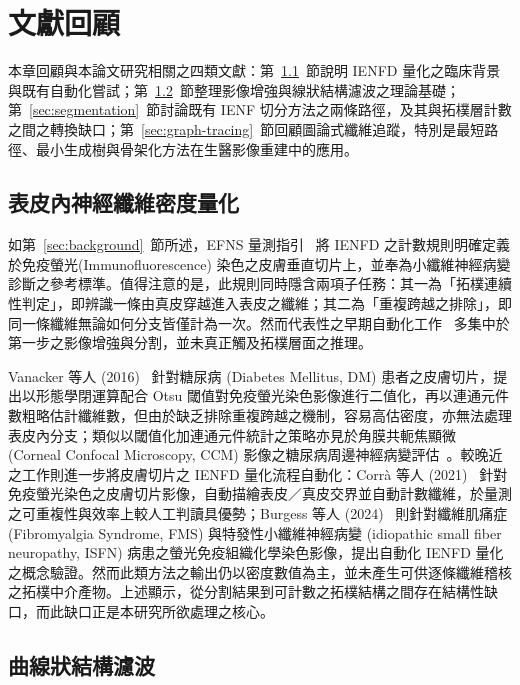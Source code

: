 
\chapter{文獻回顧}
\label{chap:related}

本章回顧與本論文研究相關之四類文獻：第~\ref{sec:ienf-related}~節說明 IENFD 量化之臨床背景與既有自動化嘗試；第~\ref{sec:vesselness}~節整理影像增強與線狀結構濾波之理論基礎；第~\ref{sec:segmentation}~節討論既有 IENF 切分方法之兩條路徑，及其與拓樸層計數之間之轉換缺口；第~\ref{sec:graph-tracing}~節回顧圖論式纖維追蹤，特別是最短路徑、最小生成樹與骨架化方法在生醫影像重建中的應用。

\section{表皮內神經纖維密度量化}
\label{sec:ienf-related}

如第~\ref{sec:background}~節所述，EFNS 量測指引~\cite{lauria2010skinbiopsy} 將 IENFD 之計數規則明確定義於免疫螢光(Immunofluorescence) 染色之皮膚垂直切片上，並奉為小纖維神經病變診斷之參考標準。值得注意的是，此規則同時隱含兩項子任務：其一為「拓樸連續性判定」，即辨識一條由真皮穿越進入表皮之纖維；其二為「重複跨越之排除」，即同一條纖維無論如何分支皆僅計為一次。然而代表性之早期自動化工作~\cite{vanacker2016automated, dabbah2011automatic} 多集中於第一步之影像增強與分割，並未真正觸及拓樸層面之推理。

Vanacker 等人 (2016)~\cite{vanacker2016automated} 針對糖尿病 (Diabetes Mellitus, DM) 患者之皮膚切片，提出以形態學閉運算配合 Otsu 閾值對免疫螢光染色影像進行二值化，再以連通元件數粗略估計纖維數，但由於缺乏排除重複跨越之機制，容易高估密度，亦無法處理表皮內分支；類似以閾值化加連通元件統計之策略亦見於角膜共軛焦顯微 (Corneal Confocal Microscopy, CCM) 影像之糖尿病周邊神經病變評估~\cite{dabbah2011automatic}。較晚近之工作則進一步將皮膚切片之 IENFD 量化流程自動化：Corr{\`a} 等人 (2021)~\cite{corra2021advantages} 針對免疫螢光染色之皮膚切片影像，自動描繪表皮／真皮交界並自動計數纖維，於量測之可重複性與效率上較人工判讀具優勢；Burgess 等人 (2024)~\cite{burgess2024automated} 則針對纖維肌痛症 (Fibromyalgia Syndrome, FMS) 與特發性小纖維神經病變 (idiopathic small fiber neuropathy, ISFN) 病患之螢光免疫組織化學染色影像，提出自動化 IENFD 量化之概念驗證。然而此類方法之輸出仍以密度數值為主，並未產生可供逐條纖維稽核之拓樸中介產物。上述顯示，從分割結果到可計數之拓樸結構之間存在結構性缺口，而此缺口正是本研究所欲處理之核心。

\section{曲線狀結構濾波}
\label{sec:vesselness}

